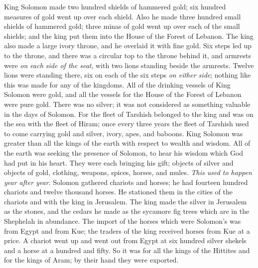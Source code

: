 \begin{biblechapter}
\verse King Solomon made two hundred shields of hammered gold; six hundred measures of gold went up over each shield.
\verse Also he made three hundred small shields of hammered gold; three minas of gold went up over each of the small shields; and the king put them into the House of the Forest of Lebanon.
\verse The king also made a large ivory throne, and he overlaid it with fine gold.
\verse Six steps led up to the throne, and there was a circular top to the throne behind it, and armrests were \textit{on each side of the seat}, with two lions standing beside the armrests.
\verse Twelve lions were standing there, six on each of the six steps \textit{on either side}; nothing like this was made for any of the kingdoms.
\verse All of the drinking vessels of King Solomon were gold, and all the vessels for the House of the Forest of Lebanon were pure gold. There was no silver; it was not considered as something valuable in the days of Solomon.
\verse For the fleet of Tarshish belonged to the king and was on the sea with the fleet of Hiram; once every three years the fleet of Tarshish used to come carrying gold and silver, ivory, apes, and baboons.
\verse King Solomon was greater than all the kings of the earth with respect to wealth and wisdom.
\verse All of the earth was seeking the presence of Solomon, to hear his wisdom which God had put in his heart.
\verse They were each bringing his gift; objects of silver and objects of gold, clothing, weapons, spices, horses, and mules. \textit{This used to happen year after year}.
\verse Solomon gathered chariots and horses; he had fourteen hundred chariots and twelve thousand horses. He stationed them in the cities of the chariots and with the king in Jerusalem.
\verse The king made the silver in Jerusalem as the stones, and the cedars he made as the sycamore fig trees which are in the Shephelah in abundance.
\verse The import of the horses which were Solomon’s was from Egypt and from Kue; the traders of the king received horses from Kue at a price.
\verse A chariot went up and went out from Egypt at six hundred silver shekels and a horse at a hundred and fifty. So it was for all the kings of the Hittites and for the kings of Aram; by their hand they were exported.
\end{biblechapter}

